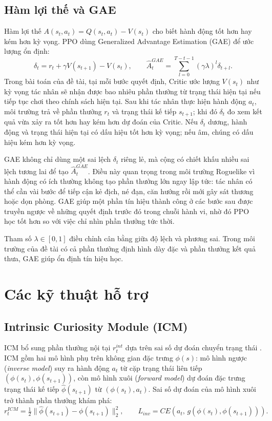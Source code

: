 \subsection{Hàm lợi thế và GAE}

Hàm lợi thế $A(s_t,a_t) = Q(s_t,a_t) - V(s_t)$ cho biết hành động tốt hơn hay kém hơn kỳ vọng. PPO dùng Generalized Advantage Estimation (GAE) để ước lượng ổn định:
\begin{equation}
    \delta_t = r_t + \gamma V(s_{t+1}) - V(s_t),
    \qquad
    \hat{A}_t^{GAE} = \sum_{l=0}^{T-t-1}(\gamma\lambda)^l \delta_{t+l}.
\end{equation}
Trong bài toán của đề tài, tại mỗi bước quyết định, Critic ước lượng $V(s_t)$ như kỳ vọng tác nhân sẽ nhận được bao nhiêu phần thưởng từ trạng thái hiện tại nếu tiếp tục chơi theo chính sách hiện tại. Sau khi tác nhân thực hiện hành động $a_t$, môi trường trả về phần thưởng $r_t$ và trạng thái kế tiếp $s_{t+1}$; khi đó $\delta_t$ đo xem kết quả vừa xảy ra tốt hơn hay kém hơn dự đoán của Critic. Nếu $\delta_t$ dương, hành động và trạng thái hiện tại có dấu hiệu tốt hơn kỳ vọng; nếu âm, chúng có dấu hiệu kém hơn kỳ vọng.

GAE không chỉ dùng một sai lệch $\delta_t$ riêng lẻ, mà cộng có chiết khấu nhiều sai lệch tương lai để tạo $\hat{A}_t^{GAE}$. Điều này quan trọng trong môi trường Roguelike vì hành động có ích thường không tạo phần thưởng lớn ngay lập tức: tác nhân có thể cần vài bước để tiếp cận kẻ địch, né đạn, căn hướng rồi mới gây sát thương hoặc dọn phòng. GAE giúp một phần tín hiệu thành công ở các bước sau được truyền ngược về những quyết định trước đó trong chuỗi hành vi, nhờ đó PPO học tốt hơn so với việc chỉ nhìn phần thưởng tức thời.

Tham số $\lambda \in [0,1]$ điều chỉnh cân bằng giữa độ lệch và phương sai. Trong môi trường của đề tài có cả phần thưởng định hình dày đặc và phần thưởng kết quả thưa, GAE giúp ổn định tín hiệu học.

\section{Các kỹ thuật hỗ trợ}

\subsection{Intrinsic Curiosity Module (ICM)}

ICM bổ sung phần thưởng nội tại $r_t^{int}$ dựa trên sai số dự đoán chuyển trạng thái \cite{Pathak2017}. ICM gồm hai mô hình phụ trên không gian đặc trưng $\phi(s)$: mô hình ngược (\emph{inverse model}) suy ra hành động $a_t$ từ cặp trạng thái liên tiếp $(\phi(s_t), \phi(s_{t+1}))$, còn mô hình xuôi (\emph{forward model}) dự đoán đặc trưng trạng thái kế tiếp $\hat{\phi}(s_{t+1})$ từ $(\phi(s_t), a_t)$. Sai số dự đoán của mô hình xuôi trở thành phần thưởng khám phá:
\begin{equation}
    r_t^{ICM} = \tfrac{1}{2}\|\hat{\phi}(s_{t+1}) - \phi(s_{t+1})\|_2^2, \qquad
    L_{inv} = CE(a_t,\, g(\phi(s_t),\phi(s_{t+1}))).
\end{equation}

